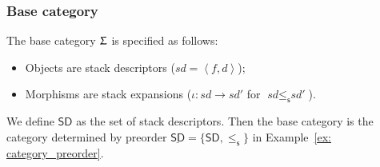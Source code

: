 \documentclass[12pt,a4paper]{report}
\theoremstyle{definition}
\newcommand{\ang}[1]{\left\langle #1 \right\rangle}
\begin{document}
    \subsubsection{Base category}
    The base category $\Upsigma$ is specified as follows:
    \begin{itemize}
        \item Objects are stack descriptors ($\textit{sd} = \ang{f, d}$);
        \item Morphisms are stack expansions ($\iota : \textit{sd} \to \textit{sd′}$ for $\textit{sd} \leq_\mathsf{s} \textit{sd′}$).
    \end{itemize}
    We define $\mathsf{SD}$ as the set of stack descriptors. Then the base category is the category determined by preorder $\underline{\mathsf{SD}} = \{\mathsf{SD}, \leq_\mathsf{s}\}$ in Example~\ref{ex: category_preorder}.
\end{document}

